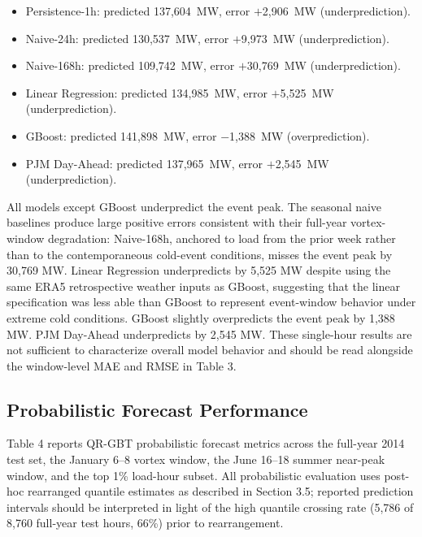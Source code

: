 \documentclass[12pt,a4paper]{article}
\begin{document}
\begin{itemize}[leftmargin=*, itemsep=2pt]
    \item Persistence-1h: predicted 137,604~MW, error $+$2,906~MW (underprediction).


    \item Naive-24h: predicted 130,537~MW, error $+$9,973~MW (underprediction).


    \item Naive-168h: predicted 109,742~MW, error $+$30,769~MW (underprediction).


    \item Linear Regression: predicted 134,985~MW, error $+$5,525~MW (underprediction).


    \item GBoost: predicted 141,898~MW, error $-$1,388~MW (overprediction).


    \item PJM Day-Ahead: predicted 137,965~MW, error $+$2,545~MW (underprediction).
\end{itemize}


All models except GBoost underpredict the event peak. The seasonal naive baselines produce large positive errors consistent with their full-year vortex-window degradation: Naive-168h, anchored to load from the prior week rather than to the contemporaneous cold-event conditions, misses the event peak by 30,769 MW. Linear Regression underpredicts by 5,525 MW despite using the same ERA5 retrospective weather inputs as GBoost, suggesting that the linear specification was less able than GBoost to represent event-window behavior under extreme cold conditions. GBoost slightly overpredicts the event peak by 1,388 MW. PJM Day-Ahead underpredicts by 2,545 MW.
These single-hour results are not sufficient to characterize overall model behavior and should be read alongside the window-level MAE and RMSE in Table 3.
\subsection{Probabilistic Forecast Performance}
Table 4 reports QR-GBT probabilistic forecast metrics across the full-year 2014 test set, the January 6–8 vortex window, the June 16–18 summer near-peak window, and the top 1\% load-hour subset. All probabilistic evaluation uses post-hoc rearranged quantile estimates as described in Section 3.5; reported prediction intervals should be interpreted in light of the high quantile crossing rate (5,786 of 8,760 full-year test hours, 66\%) prior to rearrangement.
\end{document}
